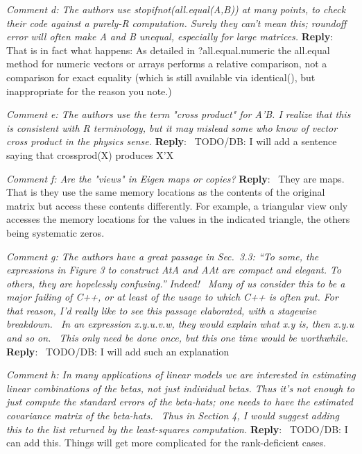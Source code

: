\documentclass[10pt]{article}
\newcommand{\pointRaised}[2]{\smallskip %
  \textsl{{\fontseries{b}\selectfont #1}: #2}\newline}
\newcommand{\reply}[1]{\textbf{Reply}:\ #1 \smallskip } %
\begin{document}
\pointRaised{Comment d}{
  The authors use stopifnot(all.equal(A,B)) at many points, to check
  their code against a purely-R computation. Surely they can't mean this;
  roundoff error will often make A and B unequal, especially for large
  matrices.
}
\reply{
  That is in fact what happens: As detailed in ?all.equal.numeric the
  all.equal method for numeric vectors or arrays performs a relative
  comparison, not a comparison for exact equality (which is still available
  via identical(), but inappropriate for the reason you note.)
}


\pointRaised{Comment e}{
  The authors use the term "cross product" for A'B. I realize that
  this is consistent with R terminology, but it may mislead some who know
  of vector cross product in the physics sense.
}
\reply{
  TODO/DB: I will add a sentence saying that crossprod(X) produces X'X
}


\pointRaised{Comment f}{
  Are the "views" in Eigen maps or copies?
}
\reply{
  They are maps.  That is they use the same memory locations as the
  contents of the original matrix but access these contents
  differently.  For example, a triangular view only accesses the
  memory locations for the values in the indicated triangle, the
  others being systematic zeros.
}



\pointRaised{Comment g}{
  The authors have a great passage in Sec.~3.3:
  ``To some, the expressions in Figure 3 to construct AtA and AAt are
  compact and elegant. To others, they are hopelessly confusing.''
  Indeed!  Many of us consider this to be a major failing of C++, or at
  least of the usage to which C++ is often put.
  For that reason, I'd really like to see this passage elaborated, with a
  stagewise breakdown.  In an expression x.y.u.v.w, they would explain
  what x.y is, then x.y.u and so on.  This only need be done once, but
  this one time would be worthwhile.
}
\reply{
  TODO/DB: I will add such an explanation
}


\pointRaised{Comment h}{
  In many applications of linear models we are interested in
  estimating linear combinations of the betas, not just individual betas.
  Thus it's not enough to just compute the standard errors of the
  beta-hats; one needs to have the estimated covariance matrix of the
  beta-hats.  Thus in Section 4, I would suggest adding this to the list
  returned by the least-squares computation.
}
\reply{
  TODO/DB: I can add this.  Things will get more complicated for the
   rank-deficient cases.
}
\end{document}

